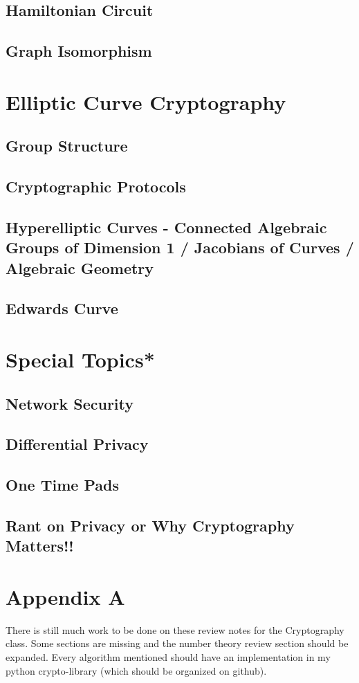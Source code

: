 \documentclass[12pt,a4paper]{article}
\begin{document}
\subsection{Hamiltonian Circuit}
\subsection{Graph Isomorphism}

\section{Elliptic Curve Cryptography}

\subsection{Group Structure} 
\subsection{Cryptographic Protocols}
\subsection{Hyperelliptic Curves - Connected Algebraic Groups of Dimension 1 / Jacobians of Curves / Algebraic Geometry}
\subsection{Edwards Curve}

\section{Special Topics*}
\subsection{Network Security}
\subsection{Differential Privacy}
\subsection{One Time Pads}
\subsection{Rant on Privacy or Why Cryptography Matters!!}

\section{Appendix A}
There is still much work to be done on these review notes for the Cryptography class. Some sections are missing and the number theory review section should be expanded. Every algorithm mentioned should have an implementation in my python crypto-library (which should be organized on github). 
\end{document}
